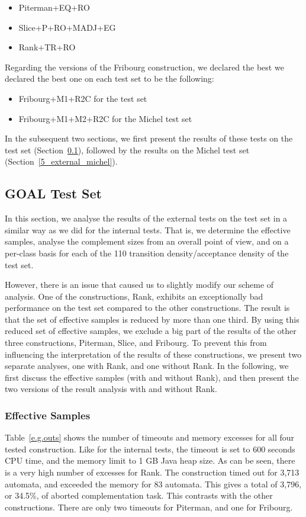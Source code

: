 \begin{itemize}
\item Piterman+EQ+RO
\item Slice+P+RO+MADJ+EG
\item Rank+TR+RO
\end{itemize}

Regarding the versions of the Fribourg construction, we declared the best we declared the best one on each test set to be the following:

\begin{itemize}
\item Fribourg+M1+R2C    \tabto{4.2cm} for the \goal{} test set
\item Fribourg+M1+M2+R2C \tabto{4.2cm} for the Michel test set
\end{itemize}

In the subsequent two sections, we first present the results of these tests on the \goal{} test set (Section~\ref{5_external_goal}), followed by the results on the Michel test set (Section~\ref{5_external_michel}).


\subsection{GOAL Test Set}
\label{5_external_goal}
In this section, we analyse the results of the external tests on the \goal{} test set in a similar way as we did for the internal tests. That is, we determine the effective samples, analyse the complement sizes from an overall point of view, and on a per-class basis for each of the 110 transition density/acceptance density of the \goal{} test set.

However, there is an issue that caused us to slightly modify our scheme of analysis. One of the constructions, Rank, exhibits an exceptionally bad performance on the \goal{} test set compared to the other constructions. The result is that the set of effective samples is reduced by more than one third. By using this reduced set of effective samples, we exclude a big part of the results of the other three constructions, Piterman, Slice, and Fribourg. To prevent this from influencing the interpretation of the results of these constructions, we present two separate analyses, one with Rank, and one without Rank. In the following, we first discuss the effective samples (with and without Rank), and then present the two versions of the result analysis with and without Rank. 


\subsubsection{Effective Samples}
Table~\ref{e.g.outs} shows the number of timeouts and memory excesses for all four tested construction. Like for the internal tests, the timeout is set to 600 seconds CPU time, and the memory limit to 1 GB Java heap size. As can be seen, there is a very high number of excesses for Rank. The construction timed out for 3,713 automata, and exceeded the memory for 83 automata. This gives a total of 3,796, or 34.5\%, of aborted complementation task. This contrasts with the other constructions. There are only two timeouts for Piterman, and one for Fribourg.

